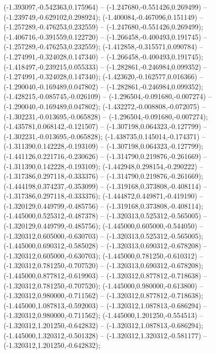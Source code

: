  (-1.393097,-0.542363,0.175964) -- (-1.247680,-0.551426,0.269499) -- (-1.239749,-0.629102,0.298924);
 (-1.400084,-0.467096,0.151149) -- (-1.257289,-0.476253,0.232559) -- (-1.247680,-0.551426,0.269499);
 (-1.406716,-0.391559,0.122720) -- (-1.266458,-0.400493,0.191745) -- (-1.257289,-0.476253,0.232559);
 (-1.412858,-0.315571,0.090784) -- (-1.274991,-0.324028,0.147340) -- (-1.266458,-0.400493,0.191745);
 (-1.418497,-0.239215,0.055333) -- (-1.282861,-0.246984,0.099352) -- (-1.274991,-0.324028,0.147340);
 (-1.423620,-0.162577,0.016366) -- (-1.290040,-0.169489,0.047802) -- (-1.282861,-0.246984,0.099352);
 (-1.428215,-0.085745,-0.026109) -- (-1.296504,-0.091680,-0.007274) -- (-1.290040,-0.169489,0.047802);
 (-1.432272,-0.008808,-0.072075) -- (-1.302231,-0.013695,-0.065828) -- (-1.296504,-0.091680,-0.007274);
 (-1.435781,0.068142,-0.121507) -- (-1.307198,0.064323,-0.127799) -- (-1.302231,-0.013695,-0.065828);
 (-1.438735,0.145014,-0.174371) -- (-1.311390,0.142228,-0.193109) -- (-1.307198,0.064323,-0.127799);
 (-1.441126,0.221716,-0.230626) -- (-1.314790,0.219876,-0.261669) -- (-1.311390,0.142228,-0.193109);
 (-1.442948,0.298154,-0.290222) -- (-1.317386,0.297118,-0.333376) -- (-1.314790,0.219876,-0.261669);
 (-1.444198,0.374237,-0.353099) -- (-1.319168,0.373808,-0.408114) -- (-1.317386,0.297118,-0.333376);
 (-1.444872,0.449871,-0.419190) -- (-1.320129,0.449799,-0.485756) -- (-1.319168,0.373808,-0.408114);
 (-1.445000,0.525312,-0.487378) -- (-1.320313,0.525312,-0.565005) -- (-1.320129,0.449799,-0.485756);
 (-1.445000,0.605000,-0.544050) -- (-1.320312,0.605000,-0.630703) -- (-1.320313,0.525312,-0.565005);
 (-1.445000,0.690312,-0.585028) -- (-1.320313,0.690312,-0.678208) -- (-1.320312,0.605000,-0.630703);
 (-1.445000,0.781250,-0.610312) -- (-1.320312,0.781250,-0.707520) -- (-1.320313,0.690312,-0.678208);
 (-1.445000,0.877812,-0.619903) -- (-1.320312,0.877812,-0.718638) -- (-1.320312,0.781250,-0.707520);
 (-1.445000,0.980000,-0.613800) -- (-1.320312,0.980000,-0.711562) -- (-1.320312,0.877812,-0.718638);
 (-1.445000,1.087813,-0.592003) -- (-1.320312,1.087813,-0.686294) -- (-1.320312,0.980000,-0.711562);
 (-1.445000,1.201250,-0.554513) -- (-1.320312,1.201250,-0.642832) -- (-1.320312,1.087813,-0.686294);
 (-1.445000,1.320312,-0.501328) -- (-1.320312,1.320312,-0.581177) -- (-1.320312,1.201250,-0.642832);
